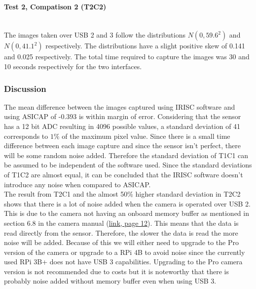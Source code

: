 \paragraph{Test 2, Compatison 2 (T2C2)}\,\\

The images taken over USB 2 and 3 follow the distributions $ N( 0, 59.6^2 ) $ and $ N( 0, 41.1^2 ) $ respectively. The distributions have a slight positive skew of 0.141 and 0.025 respectively. The total time required to capture the images was 30 and 10 seconds respectively for the two interfaces.

\vspace{-.3cm}
\subsubsection*{Discussion}

The mean difference between the images captured using IRISC software and using ASICAP of -0.393 is within margin of error. Considering that the sensor has a 12 bit ADC resulting in 4096 possible values, a standard deviation of 41 corresponds to $1\%$ of the maximum pixel value. Since there is a small time difference between each image capture and since the sensor isn't perfect, there will be some random noise added. Therefore the standard deviation of T1C1 can be assumed to be independent of the software used. Since the standard deviations of T1C2 are almost equal, it can be concluded that the IRISC software doesn't introduce any noise when compared to ASICAP.\\

\vspace{-.1cm}
The result from T2C1 and the almost 50\% higher standard deviation in T2C2 shows that there is a lot of noise added when the camera is operated over USB 2. This is due to the camera not having an onboard memory buffer as mentioned in section 6.8 in the camera manual (\href{https://astronomy-imaging-camera.com/manuals/ASI183\%20Manual\%20EN.pdf}{link, page 12}). This means that the data is read directly from the sensor. Therefore, the slower the data is read the more noise will be added. Because of this we will either need to upgrade to the Pro version of the camera or upgrade to a RPi 4B to avoid noise since the currently used RPi 3B+ does not have USB 3 capabilities. Upgrading to the Pro camera version is not recommended due to costs but it is noteworthy that there is probably noise added without memory buffer even when using USB 3.